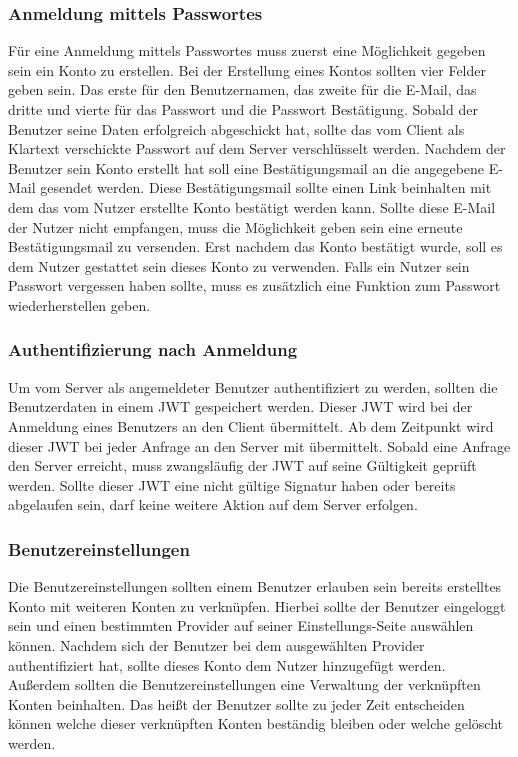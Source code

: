 \documentclass[paper=a4,fontsize=12pt,parskip=half]{scrartcl}
\begin{document}
	\subsubsection{Anmeldung mittels Passwortes}
	Für eine Anmeldung mittels Passwortes muss zuerst eine Möglichkeit gegeben sein ein Konto zu erstellen. Bei der Erstellung eines Kontos sollten vier Felder geben sein. Das erste für den Benutzernamen, das zweite für die E-Mail, das dritte und vierte für das Passwort und die Passwort Bestätigung. Sobald der Benutzer seine Daten erfolgreich abgeschickt hat, sollte das vom Client als Klartext verschickte Passwort auf dem Server verschlüsselt werden. Nachdem der Benutzer sein Konto erstellt hat soll eine Bestätigungsmail an die angegebene E-Mail gesendet werden. Diese Bestätigungsmail sollte einen Link beinhalten mit dem das vom Nutzer erstellte Konto bestätigt werden kann. Sollte diese E-Mail der Nutzer nicht empfangen, muss die Möglichkeit geben sein eine erneute Bestätigungsmail zu versenden. Erst nachdem das Konto bestätigt wurde, soll es dem Nutzer gestattet sein dieses Konto zu verwenden. Falls ein Nutzer sein Passwort vergessen haben sollte, muss es zusätzlich eine Funktion zum Passwort wiederherstellen geben.
	
	\subsubsection{Authentifizierung nach Anmeldung}
	Um vom Server als angemeldeter Benutzer authentifiziert zu werden, sollten die Benutzerdaten in einem \gls{JWT} gespeichert werden. Dieser \gls{JWT} wird bei der Anmeldung eines Benutzers an den Client übermittelt. Ab dem Zeitpunkt wird dieser \gls{JWT} bei jeder Anfrage an den Server mit übermittelt. Sobald eine Anfrage den Server erreicht, muss zwangsläufig der \gls{JWT} auf seine Gültigkeit geprüft werden. Sollte dieser \gls{JWT} eine nicht gültige Signatur haben oder bereits abgelaufen sein, darf keine weitere Aktion auf dem Server erfolgen.
	
	\subsubsection{Benutzereinstellungen}
	Die Benutzereinstellungen sollten einem Benutzer erlauben sein bereits erstelltes Konto mit weiteren Konten zu verknüpfen. Hierbei sollte der Benutzer eingeloggt sein und einen bestimmten Provider auf seiner Einstellungs-Seite auswählen können. Nachdem sich der Benutzer bei dem ausgewählten Provider authentifiziert hat, sollte dieses Konto dem Nutzer hinzugefügt werden.  Außerdem sollten die Benutzereinstellungen eine Verwaltung der verknüpften Konten beinhalten. Das heißt der Benutzer sollte zu jeder Zeit entscheiden können welche dieser verknüpften Konten beständig bleiben oder welche gelöscht werden.
	
\end{document}
